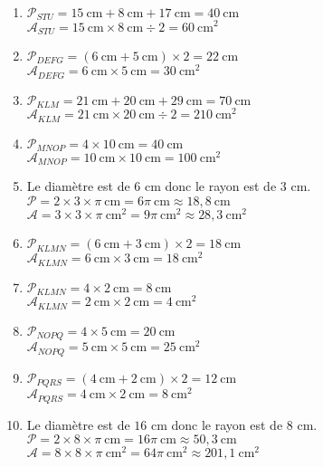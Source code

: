 \documentclass[a4paper,11pt,fleqn]{article}
\begin{document}
\begin{correction}
\begin{multicols}{2}
\begin{enumerate}
	\item $\mathcal{P}_{STU}=15~\text{cm}+8~\text{cm}+17~\text{cm}=40~\text{cm}$\\
$\mathcal{A}_{STU}=15~\text{cm}\times8~\text{cm}\div2=60~\text{cm}^2$
	\item $\mathcal{P}_{DEFG}=(6~\text{cm}+5~\text{cm})\times2=22~\text{cm}$\\
$\mathcal{A}_{DEFG}=6~\text{cm}\times5~\text{cm}=30~\text{cm}^2$
	\item $\mathcal{P}_{KLM}=21~\text{cm}+20~\text{cm}+29~\text{cm}=70~\text{cm}$\\
$\mathcal{A}_{KLM}=21~\text{cm}\times20~\text{cm}\div2=210~\text{cm}^2$
	\item $\mathcal{P}_{MNOP}=4\times10~\text{cm}=40~\text{cm}$\\
$\mathcal{A}_{MNOP}=10~\text{cm}\times10~\text{cm}=100~\text{cm}^2$
	\item Le diamètre est de $6$ cm donc le rayon est de $3$ cm.\\
$\mathcal{P}=2\times3\times\pi~\text{cm}=6\pi~\text{cm}\approx18,8~\text{cm}$\\
$\mathcal{A}=3\times3\times\pi~\text{cm}^2=9\pi~\text{cm}^2\approx28,3~\text{cm}^2$
	\item $\mathcal{P}_{KLMN}=(6~\text{cm}+3~\text{cm})\times2=18~\text{cm}$\\
$\mathcal{A}_{KLMN}=6~\text{cm}\times3~\text{cm}=18~\text{cm}^2$
	\item $\mathcal{P}_{KLMN}=4\times2~\text{cm}=8~\text{cm}$\\
$\mathcal{A}_{KLMN}=2~\text{cm}\times2~\text{cm}=4~\text{cm}^2$
	\item $\mathcal{P}_{NOPQ}=4\times5~\text{cm}=20~\text{cm}$\\
$\mathcal{A}_{NOPQ}=5~\text{cm}\times5~\text{cm}=25~\text{cm}^2$
	\item $\mathcal{P}_{PQRS}=(4~\text{cm}+2~\text{cm})\times2=12~\text{cm}$\\
$\mathcal{A}_{PQRS}=4~\text{cm}\times2~\text{cm}=8~\text{cm}^2$
	\item Le diamètre est de $16$ cm donc le rayon est de $8$ cm.\\
$\mathcal{P}=2\times8\times\pi~\text{cm}=16\pi~\text{cm}\approx50,3~\text{cm}$\\
$\mathcal{A}=8\times8\times\pi~\text{cm}^2=64\pi~\text{cm}^2\approx201,1~\text{cm}^2$
\end{enumerate}
\end{multicols}


\end{correction}
\end{document}
